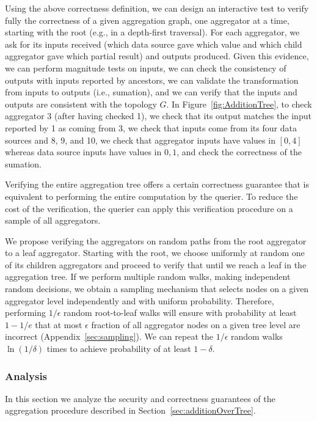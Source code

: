 \documentclass[11pt,twocolumn]{MyTightStyle}
\theoremstyle{plain}
\theoremstyle{definition}
\theoremstyle{remark}
\numberwithin{equation}{section}
\begin{document}
Using the above correctness definition, we can design an interactive
test to verify fully the correctness of a given aggregation graph, one
aggregator at a time, starting with the root (e.g., in a depth-first
traversal).  For each aggregator, we ask for its inputs received (which
data source gave which value and which child aggregator gave which
partial result) and outputs produced.  Given this evidence, we can
perform magnitude tests on inputs, we can check the consistency of
outputs with inputs reported by ancestors, we can validate the
transformation from inputs to outputs (i.e., sumation), and we can
verify that the inputs and outputs are consistent with the topology
$G$.  In Figure~\ref{fig:AdditionTree}, to check aggregator 3 (after
having checked 1), we check that its output matches the input reported
by 1 as coming from 3, we check that inputs come from its four data
sources and 8, 9, and 10, we check that aggregator inputs have values in
$[0,4]$ whereas data source inputs have values in ${0,1}$, and check the
correctness of the sumation.

Verifying the entire aggregation tree offers a certain correctness
guarantee that is equivalent to performing the entire computation by the
querier.  To reduce the cost of the verification, the querier can apply
this verification procedure on a sample of all aggregators.

We propose verifying the aggregators on random paths from the root
aggregator to a leaf aggregator.  Starting with the root, we choose
uniformly at random one of its children aggregators and proceed to
verify that until we reach a leaf in the aggregation tree.  If we perform
multiple random walks, making independent random decisions, we obtain a
sampling mechanism that selects nodes on a given aggregator level
independently and with uniform probability. Therefore, performing
$1/\epsilon$ random root-to-leaf walks will ensure with probability at
least $1-1/e$ that at most $\epsilon$ fraction of all aggregator nodes
on a given tree level are incorrect (Appendix~\ref{sec:sampling}). We
can repeat the $1/\epsilon$ random walks $\ln(1/\delta)$ times to
achieve probability of at least $1-\delta$.

\subsubsection{Analysis}
\label{sec:additionOverTree:analysis}
In this section we analyze the security and correctness guarantees of
the aggregation procedure described in
Section~\ref{sec:additionOverTree}.
\end{document}
